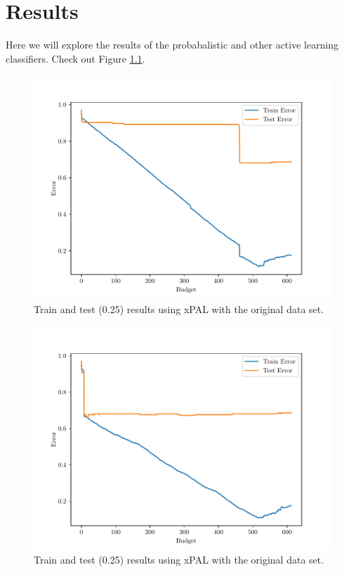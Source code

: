 \chapter{Results}

Here we will explore the results of the probabalistic and other active learning classifiers. Check out Figure \ref{fig:xpal_train_test}.

\begin{figure}[!ht]
  \centering
  \includegraphics[width=\textwidth]{../img/performances_tfidf_data_xpal-0.001_0.25_rbf_mean_612_50001.pdf}
  \caption{Train and test (0.25) results using xPAL with the original data set.}
  \label{fig:xpal_train_test}
\end{figure}


\begin{figure}[!ht]
  \centering
  \includegraphics[width=\textwidth]{../img/performances_tfidf_data_pal-0.001_0.25_rbf_mean_612_50001.pdf}
  \caption{Train and test (0.25) results using xPAL with the original data set.}
  \label{fig:pal_train_test}
\end{figure}

